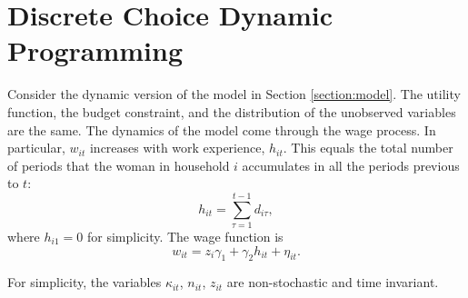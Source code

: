 \section{Discrete Choice Dynamic Programming}
Consider the dynamic version of the model in Section \ref{section:model}. The utility function, the budget constraint, and the distribution of the unobserved variables are the same. The dynamics of the model come through the wage process. In particular, $w_{it}$ increases with work experience, $h_{it}$. This equals the total number of periods that the woman in household $i$ accumulates in all the periods previous to $t$:
\begin{equation}
h_{it} = \sum\limits_{\tau=1}^{t-1} d_{i\tau},
\end{equation} 
\noindent where $h_{i1} = 0$ for simplicity. The wage function is
\begin{equation}
w_{it} = z_{i}\gamma_{1} + \gamma_{2}h_{it} + \eta_{it}.
\end{equation} 

\noindent For simplicity, the variables $\kappa_{it}$, $n_{it}$, $z_{it}$ are non-stochastic and time invariant.

